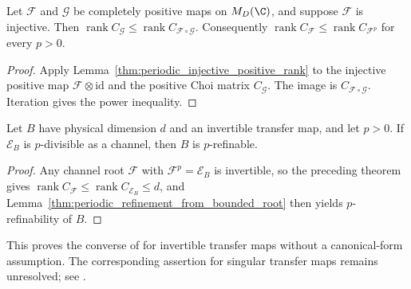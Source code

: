 \begin{lemma}
    \label{thm:periodic_injective_composition_choi_rank}
    \leanok
    Let $\mathcal F$ and $\mathcal G$ be completely positive maps on
    $M_D(\C)$, and suppose $\mathcal F$ is injective. Then
    $\operatorname{rank}C_{\mathcal G}\le
        \operatorname{rank}C_{\mathcal F\circ\mathcal G}$.
    Consequently $\operatorname{rank}C_{\mathcal F}\le
        \operatorname{rank}C_{\mathcal F^p}$ for every $p>0$.
\end{lemma}

\begin{proof}\leanok
    Apply Lemma~\ref{thm:periodic_injective_positive_rank} to the
    injective positive map $\mathcal F\otimes\mathrm{id}$ and the
    positive Choi matrix $C_{\mathcal G}$. The image is
    $C_{\mathcal F\circ\mathcal G}$. Iteration gives the power inequality.
\end{proof}

\begin{lemma}
    \label{thm:periodic_refinement_injective_transfer}
    \leanok
    Let $B$ have physical dimension $d$ and an invertible transfer map,
    and let $p>0$. If $\mathcal E_B$ is $p$-divisible as a channel,
    then $B$ is $p$-refinable.
\end{lemma}

\begin{proof}\leanok
    Any channel root $\mathcal F$ with $\mathcal F^p=\mathcal E_B$ is
    invertible, so the preceding theorem gives
    $\operatorname{rank}C_{\mathcal F}\le
        \operatorname{rank}C_{\mathcal E_B}\le d$,
    and Lemma~\ref{thm:periodic_refinement_from_bounded_root} then yields
    $p$-refinability of $B$.
\end{proof}

\begin{remark}
    This proves the converse of
    \cite[Theorem~4.1]{DeLasCuevas2017Irreducible} for invertible transfer
    maps without a canonical-form assumption. The corresponding assertion
    for singular transfer maps remains unresolved; see
    \cite{gap:dccsp17_root_kraus_rank_thm41}.
\end{remark}


